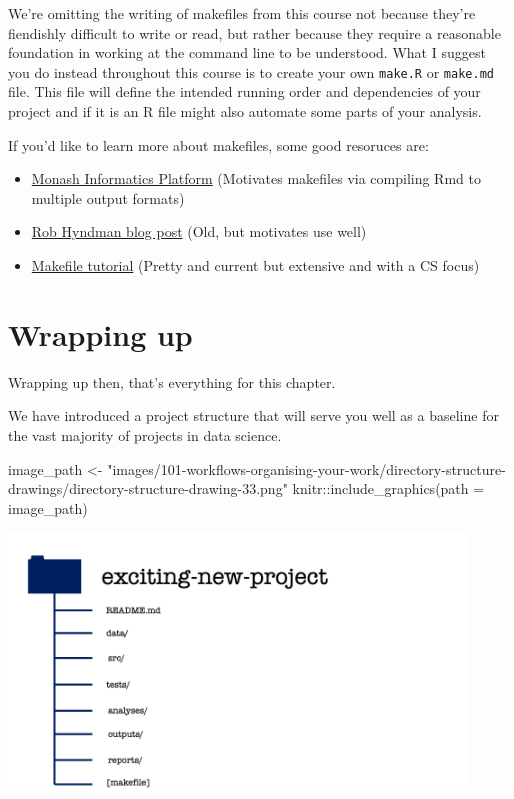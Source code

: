 \documentclass[
  letterpaper,
  DIV=11,
  numbers=noendperiod]{scrreprt}
\newenvironment{Shaded}{\begin{snugshade}}{\end{snugshade}}
\newcommand{\AttributeTok}[1]{\textcolor[rgb]{0.40,0.45,0.13}{#1}}
\newcommand{\FunctionTok}[1]{\textcolor[rgb]{0.28,0.35,0.67}{#1}}
\newcommand{\NormalTok}[1]{\textcolor[rgb]{0.00,0.23,0.31}{#1}}
\newcommand{\OtherTok}[1]{\textcolor[rgb]{0.00,0.23,0.31}{#1}}
\newcommand{\SpecialCharTok}[1]{\textcolor[rgb]{0.37,0.37,0.37}{#1}}
\newcommand{\StringTok}[1]{\textcolor[rgb]{0.13,0.47,0.30}{#1}}
\providecommand{\tightlist}{%
  \setlength{\itemsep}{0pt}\setlength{\parskip}{0pt}}\usepackage{longtable,booktabs,array}
\begin{document}
We're omitting the writing of makefiles from this course not because
they're fiendishly difficult to write or read, but rather because they
require a reasonable foundation in working at the command line to be
understood. What I suggest you do instead throughout this course is to
create your own \texttt{make.R} or \texttt{make.md} file. This file will
define the intended running order and dependencies of your project and
if it is an R file might also automate some parts of your analysis.

If you'd like to learn more about makefiles, some good resoruces are:

\begin{itemize}
\tightlist
\item
  \href{https://monashbioinformaticsplatform.github.io/2017-11-16-open-science-training/topics/automation.html}{Monash
  Informatics Platform} (Motivates makefiles via compiling Rmd to
  multiple output formats)
\item
  \href{https://robjhyndman.com/hyndsight/makefiles/}{Rob Hyndman blog
  post} (Old, but motivates use well)
\item
  \href{https://makefiletutorial.com/\#getting-started}{Makefile
  tutorial} (Pretty and current but extensive and with a CS focus)
\end{itemize}

\section{Wrapping up}\label{wrapping-up}

Wrapping up then, that's everything for this chapter.

We have introduced a project structure that will serve you well as a
baseline for the vast majority of projects in data science.

\begin{Shaded}
\begin{Highlighting}[]
\NormalTok{image\_path }\OtherTok{\textless{}{-}} \StringTok{"images/101{-}workflows{-}organising{-}your{-}work/directory{-}structure{-}drawings/directory{-}structure{-}drawing{-}33.png"}
\NormalTok{knitr}\SpecialCharTok{::}\FunctionTok{include\_graphics}\NormalTok{(}\AttributeTok{path =}\NormalTok{ image\_path)}
\end{Highlighting}
\end{Shaded}

\includegraphics[width=4.8in,height=\textheight]{images/101-workflows-organising-your-work/directory-structure-drawings/directory-structure-drawing-33.png}
\end{document}
